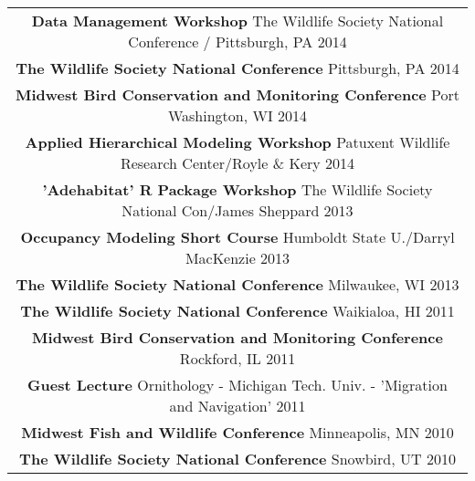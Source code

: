 \documentclass[letterpaper,11pt]{article}
\begin{document}
	\begin{center}\begin{tabular*}{6.9in}{l@{\extracolsep{\fill}}r}
	
\multicolumn{2}{c}{{\bf Data Management Workshop} The Wildlife Society National Conference / Pittsburgh, PA \cftdotfill{\cftdotsep}2014}\\

\multicolumn{2}{c}{{\bf The Wildlife Society National Conference} Pittsburgh, PA \cftdotfill{\cftdotsep}2014}\\

\multicolumn{2}{c}{{\bf Midwest Bird Conservation and Monitoring Conference} Port Washington, WI \cftdotfill{\cftdotsep}2014}\\

\multicolumn{2}{c}{{\bf Applied Hierarchical Modeling Workshop} Patuxent Wildlife Research Center/Royle \& Kery \cftdotfill{\cftdotsep}2014}\\

\multicolumn{2}{c}{{\bf 'Adehabitat' R Package Workshop} The Wildlife Society National Con/James Sheppard  \cftdotfill{\cftdotsep}2013}\\

\multicolumn{2}{c}{{\bf Occupancy Modeling Short Course} Humboldt State U./Darryl MacKenzie  \cftdotfill{\cftdotsep}2013}\\

\multicolumn{2}{c}{{\bf The Wildlife Society National Conference} Milwaukee, WI \cftdotfill{\cftdotsep}2013}\\

\multicolumn{2}{c}{{\bf The Wildlife Society National Conference} Waikialoa, HI \cftdotfill{\cftdotsep}2011}\\

\multicolumn{2}{c}{{\bf Midwest Bird Conservation and Monitoring Conference} Rockford, IL  \cftdotfill{\cftdotsep}2011}\\

\multicolumn{2}{c}{{\bf Guest Lecture} Ornithology - Michigan Tech. Univ. - 'Migration and Navigation'  \cftdotfill{\cftdotsep}2011}\\

\multicolumn{2}{c}{{\bf Midwest Fish and Wildlife Conference} Minneapolis, MN  \cftdotfill{\cftdotsep}2010}\\

\multicolumn{2}{c}{{\bf The Wildlife Society National Conference} Snowbird, UT \cftdotfill{\cftdotsep}2010}\\


\end{tabular*}
\end{center}
\end{document}
